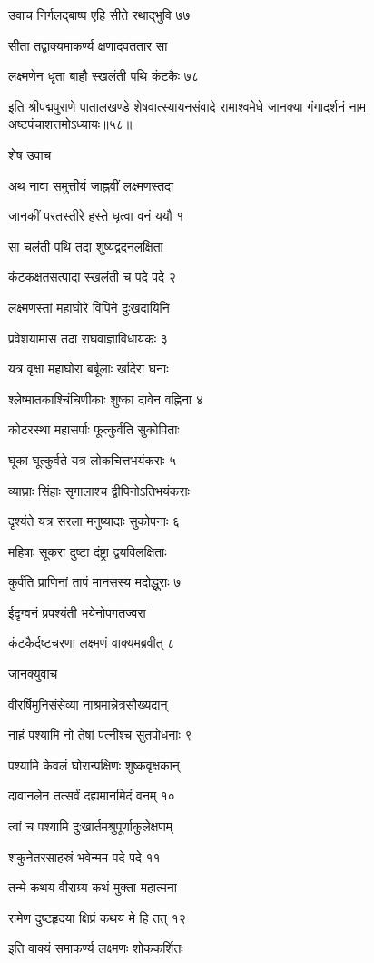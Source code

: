 उवाच निर्गलद्बाष्प एहि सीते रथाद्भुवि ७७

सीता तद्वाक्यमाकर्ण्य क्षणादवततार सा

लक्ष्मणेन धृता बाहौ स्खलंती पथि कंटकैः ७८

इति श्रीपद्मपुराणे पातालखण्डे शेषवात्स्यायनसंवादे रामाश्वमेधे जानक्या गंगादर्शनं नाम अष्टपंचाशत्तमोऽध्यायः॥५८॥


शेष उवाच

अथ नावा समुत्तीर्य जाह्नवीं लक्ष्मणस्तदा

जानकीं परतस्तीरे हस्ते धृत्वा वनं ययौ १

सा चलंती पथि तदा शुष्यद्वदनलक्षिता

कंटकक्षतसत्पादा स्खलंती च पदे पदे २

लक्ष्मणस्तां महाघोरे विपिने दुःखदायिनि

प्रवेशयामास तदा राघवाज्ञाविधायकः ३

यत्र वृक्षा महाघोरा बर्बूलाः खदिरा घनाः

श्लेष्मातकाश्चिंचिणीकाः शुष्का दावेन वह्निना ४

कोटरस्था महासर्पाः फूत्कुर्वंति सुकोपिताः

घूका घूत्कुर्वते यत्र लोकचित्तभयंकराः ५

व्याघ्राः सिंहाः सृगालाश्च द्वीपिनोऽतिभयंकराः

दृश्यंते यत्र सरला मनुष्यादाः सुकोपनाः ६

महिषाः सूकरा दुष्टा दंष्ट्रा द्वयविलक्षिताः

कुर्वंति प्राणिनां तापं मानसस्य मदोद्धुराः ७

ईदृग्वनं प्रपश्यंती भयेनोपगतज्वरा

कंटकैर्दष्टचरणा लक्ष्मणं वाक्यमब्रवीत् ८

जानक्युवाच

वीरर्षिमुनिसंसेव्या नाश्रमान्नेत्रसौख्यदान्

नाहं पश्यामि नो तेषां पत्नीश्च सुतपोधनाः ९

पश्यामि केवलं घोरान्पक्षिणः शुष्कवृक्षकान्

दावानलेन तत्सर्वं दह्यमानमिदं वनम् १०

त्वां च पश्यामि दुःखार्तमश्रुपूर्णाकुलेक्षणम्

शकुनेतरसाहस्रं भवेन्मम पदे पदे ११

तन्मे कथय वीराग्र्य कथं मुक्ता महात्मना

रामेण दुष्टहृदया क्षिप्रं कथय मे हि तत् १२

इति वाक्यं समाकर्ण्य लक्ष्मणः शोककर्शितः

